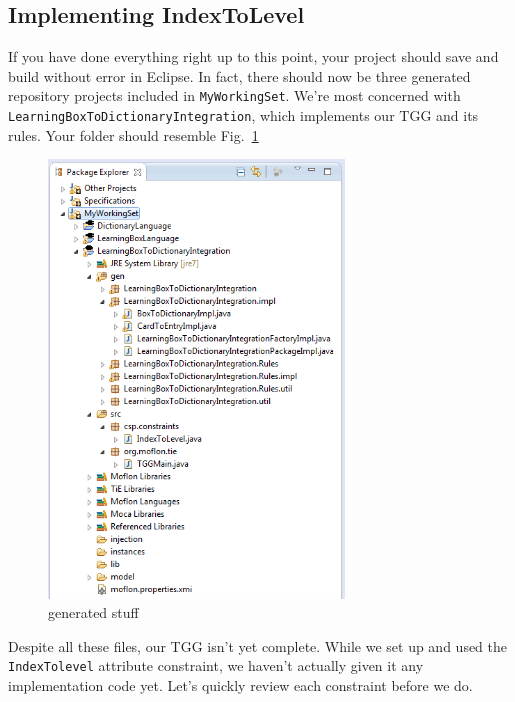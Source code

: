 \newpage
\hypertarget{rules common}{}
\subsection{Implementing IndexToLevel}
\genHeader

If you have done everything right up to this point, your project should save and build without error in Eclipse. In fact, there should now be three
generated repository projects included in \texttt{MyWorkingSet}. We're most concerned with \texttt{LearningBox\-To\-Dictionary\-Integration}, which implements
our TGG and its rules. Your folder should resemble Fig.~\ref{fig:tggGenerated}


\begin{figure}[htbp]
\begin{center}
  \includegraphics[width=0.7\textwidth]{eclipse_generatedTGG}
  \caption{generated stuff}
  \label{fig:tggGenerated}
\end{center}
\end{figure}

Despite all these files, our TGG isn't yet complete. While we set up and used the \texttt{IndexTolevel} attribute constraint, we haven't actually given it any
implementation code yet. Let's quickly review each constraint before we do.

